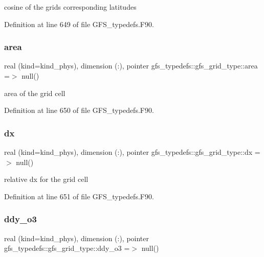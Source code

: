 cosine of the grids corresponding latitudes 



Definition at line 649 of file G\+F\+S\+\_\+typedefs.\+F90.

\mbox{\label{structgfs__typedefs_1_1gfs__grid__type_a4d001df88742f8faf44edf35652f1383}} 
\subsubsection{area}
{\footnotesize\ttfamily real (kind=kind\+\_\+phys), dimension   (\+:), pointer gfs\+\_\+typedefs\+::gfs\+\_\+grid\+\_\+type\+::area =$>$ null()}



area of the grid cell 



Definition at line 650 of file G\+F\+S\+\_\+typedefs.\+F90.

\mbox{\label{structgfs__typedefs_1_1gfs__grid__type_a69a57baf1454cfb8d52829523ade98bc}} 
\subsubsection{dx}
{\footnotesize\ttfamily real (kind=kind\+\_\+phys), dimension     (\+:), pointer gfs\+\_\+typedefs\+::gfs\+\_\+grid\+\_\+type\+::dx =$>$ null()}



relative dx for the grid cell 



Definition at line 651 of file G\+F\+S\+\_\+typedefs.\+F90.

\mbox{\label{structgfs__typedefs_1_1gfs__grid__type_ac7d538f0e7980e44a70fe9e25f59baa1}} 
\subsubsection{ddy\+\_\+o3}
{\footnotesize\ttfamily real (kind=kind\+\_\+phys), dimension    (\+:), pointer gfs\+\_\+typedefs\+::gfs\+\_\+grid\+\_\+type\+::ddy\+\_\+o3 =$>$ null()}



